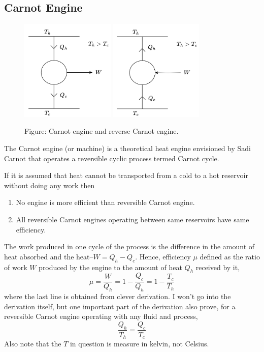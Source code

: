 \documentclass[../../../Main.tex]{subfiles}
\begin{document}
\subsection{Carnot Engine}
\begin{figure}
    \centering
    \includegraphics[width=0.4\textwidth]{../../../Rss/Themodynamics/KeyConcepts/CarnotEngine.png}
    \includegraphics[width=0.4\textwidth]{../../../Rss/Themodynamics/KeyConcepts/ReverseCarnotEngine.png}
    \caption*{Figure: Carnot engine and reverse Carnot engine.}
\end{figure}
The Carnot engine (or machine) is a theoretical heat engine envisioned by Sadi Carnot that operates a reversible cyclic process termed Carnot cycle.

If it is assumed that heat cannot be transported from a cold to a hot reservoir without doing any work then
\begin{enumerate}
    \item No engine is more efficient than reversible Carnot engine.
    \item All reversible Carnot engines operating between same reservoirs have same efficiency. 
\end{enumerate}

The work produced in one cycle of the process is the difference in the amount of heat absorbed and the heat--$W=Q_h-Q_c$. Hence, efficiency $\mu$ defined as the ratio of work $W$ produced by the engine to the amount of heat $Q_h$ received by it,
\begin{equation*}
    \mu=\frac{W}{Q_h}=1-\frac{Q_c }{Q_h}=1-\frac{T_c}{T_h}
\end{equation*}
where the last line is obtained from clever derivation. I won't go into the derivation itself, but one important part of the derivation also prove, for a reversible Carnot engine operating with any fluid and process, 
\begin{equation*}
    \frac{Q_h}{T_h}=\frac{Q_c}{T_c}
\end{equation*}
Also note that the $T$ in question is measure in kelvin, not Celsius. 
\end{document}

